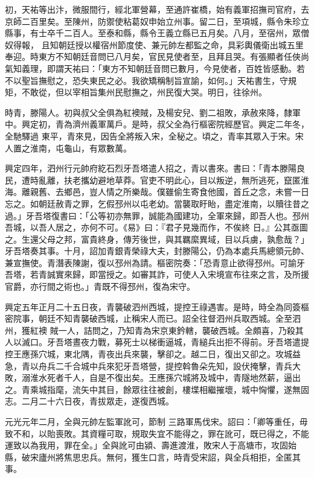 \begin{pinyinscope}
 初，天祐等出汴，微服間行，經北軍營幕，至通許崔橋，始有義軍招撫司官府，去京師二百里矣。至陳州，防禦使粘葛奴申始立州事。留二日，至項城，縣令朱珍立縣事，有士卒千二百人。至泰和縣，縣令王義立縣已五月矣。八月，至宿州，眾僧奴得報，
 且知朝廷授以權宿州節度使、兼元帥左都監之命，具彩輿儀衛出城五里奉迎。時東方不知朝廷音問已八月矣，官民見使者至，且拜且哭。有張顯者任俠尚氣知義理，即謂天祐曰：「東方不知朝廷音問已數月，今見使者，百姓皆感動。若不以聖旨撫慰之，恐失東民之必。我欲矯稱制旨宣諭，如何。」天祐書生，守規矩，不敢從，但以宰相旨集州民慰撫之，州民復大哭。明日，往徐州。



 時青，滕陽人。初與叔父全俱為紅襖賊，及楊安兒、劉二祖敗，承赦來降，隸軍中。興定初，青為濟州義軍萬戶。是時，叔父全為行樞密院經歷官。興定二年冬，全馳驛過
 東平，青來見，因告全將叛入宋，全秘之。頃之，青率其眾入于宋。宋人置之淮南，屯龜山，有眾數萬。



 興定四年，泗州行元帥府紇石烈牙吾塔遣人招之，青以書來。書曰：「青本滕陽良民，遭時亂離，扶老攜幼避地草莽。官吏不明此心，目以叛逆，無所逃死，竄匿淮海。離親舊、去鄉邑，豈人情之所樂哉。僕雖偷生寄食他國，首丘之念，未嘗一日忘之。如朝廷赦青之罪，乞假邳州以屯老幼。當襲取盱眙，盡定淮南，以贖往昔之過。」牙吾塔復書曰：「公等初亦無罪，誠能為國建功，全軍來歸，即吾人也。邳州吾城，以吾人居之，亦何不可。《易》曰：『君子見幾而作，不俟終
 日。』公其亟圖之。生還父母之邦，富貴終身，傳芳後世，與其羈縻異域，目以兵虜，孰愈哉？」牙吾塔奏其事。十月，詔加青銀青榮祿大夫，封滕陽公，仍為本處兵馬總領元帥、兼宣撫使。青潛表陳謝，復以邳州為請。樞密院奏：「恐青意止欲得邳州。可諭牙吾塔，若青誠實來歸，即當授之。如審其詐，可使人入宋境宣布往來之言，及所援官爵，亦行間之術也。」青既不得邳州，復為宋守。



 興定五年正月二十五日夜，青襲破泗州西城，提控王祿遇害。是時，時全為同簽樞密院事，朝廷不知青襲破西城，止稱宋人而已。詔全往督泗州兵取西城。全至泗州，獲紅襖
 賊一人，詰問之，乃知青為宋京東鈐轄，襲破西城。全頗喜，乃殺其人以滅口。牙吾塔晝夜力戰，募死士以梯衝逼城，青縋兵出拒不得前。牙吾塔遣提控王應孫穴城，東北隅，青夜出兵來襲，擊卻之。越二日，復出又卻之。攻城益急，青以舟兵二千合城中兵來犯牙吾塔營，提控斡魯朵先知，設伏掩擊，青兵大敗，溺淮水死者千人，自是不復出矣。王應孫穴城將及城中，青隧地然薪，逼出之。青乘城指麾，流矢中其目，餘眾往往被創，樓堞相繼摧壞，城中恟懼，遂無固志。二月二十六日夜，青拔眾走，遂復西城。



 元光元年二月，全與元帥左監軍訛可，節制
 三路軍馬伐宋。詔曰：「卿等重任，毋致不和，以貽喪敗。其資糧可取，規取失宜不能得之，罪在訛可，既已得之，不能運致以為我用，罪在全。」全與訛可由潁、壽進渡淮，敗宋人于高塘市，攻固始縣，破宋廬州將焦思忠兵。無何，獲生口言，時青受宋詔，與全兵相拒，全匿其事。




\end{pinyinscope}
